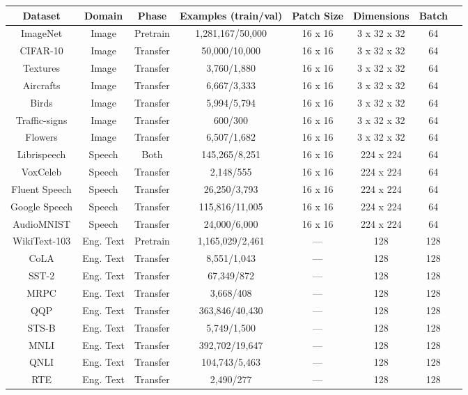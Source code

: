 \documentclass{article}
\begin{document}
\begin{small}
\begin{table}
\centering
\begin{tabular}{cccccccc}
\toprule
Dataset & Domain & Phase & Examples (train/val) & Patch Size & Dimensions & Batch \\
\midrule
ImageNet   & Image & Pretrain & 1,281,167/50,000 & 16 x 16 & 3 x 32 x 32 & 64 \\
CIFAR-10   & Image & Transfer & 50,000/10,000 & 16 x 16 & 3 x 32 x 32 & 64 \\
Textures   & Image & Transfer & 3,760/1,880 & 16 x 16 & 3 x 32 x 32 & 64 \\
Aircrafts   & Image & Transfer & 6,667/3,333 & 16 x 16 & 3 x 32 x 32 & 64 \\
Birds   & Image & Transfer & 5,994/5,794 & 16 x 16 & 3 x 32 x 32 & 64 \\
Traffic-signs   & Image & Transfer & 600/300 & 16 x 16 & 3 x 32 x 32 & 64 \\
Flowers   & Image & Transfer & 6,507/1,682 & 16 x 16 & 3 x 32 x 32 & 64 \\
Librispeech   & Speech & Both & 145,265/8,251 & 16 x 16 & 224 x 224 & 64 \\
VoxCeleb   & Speech & Transfer & 2,148/555 & 16 x 16 & 224 x 224 & 64 \\
Fluent Speech   & Speech & Transfer & 26,250/3,793 & 16 x 16 & 224 x 224 & 64 \\
Google Speech   & Speech & Transfer & 115,816/11,005 & 16 x 16 & 224 x 224 & 64 \\
AudioMNIST   & Speech & Transfer & 24,000/6,000 & 16 x 16 & 224 x 224 & 64 \\
WikiText-103   & Eng. Text & Pretrain & 1,165,029/2,461 & --- & 128 & 128 \\
CoLA   & Eng. Text & Transfer & 8,551/1,043 & --- & 128 & 128 \\
SST-2   & Eng. Text & Transfer & 67,349/872 & --- & 128 & 128 \\
MRPC   & Eng. Text & Transfer & 3,668/408 & --- & 128 & 128 \\
QQP   & Eng. Text & Transfer & 363,846/40,430 & --- & 128 & 128 \\
STS-B   & Eng. Text & Transfer & 5,749/1,500 & --- & 128 & 128 \\
MNLI   & Eng. Text & Transfer & 392,702/19,647 & --- & 128 & 128 \\
QNLI   & Eng. Text & Transfer & 104,743/5,463 & --- & 128 & 128 \\
RTE   & Eng. Text & Transfer & 2,490/277 & --- & 128 & 128 \\

\end{tabular}
\end{table}
\end{small}
\end{document}
